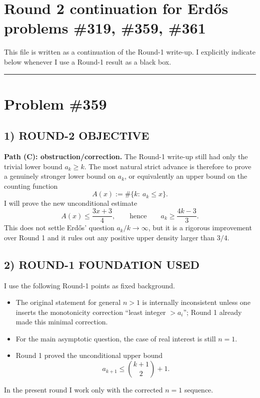 
\section*{Round 2 continuation for Erd\H{o}s problems \#319, \#359, \#361}

This file is written as a continuation of the Round-1 write-up.  I explicitly indicate below whenever I use a Round-1 result as a black box.

\bigskip
\hrule
\bigskip

\section*{Problem \#359}

\subsection*{1) ROUND-2 OBJECTIVE}
\textbf{Path (C): obstruction/correction.}  The Round-1 write-up still had only the trivial lower bound $a_k\ge k$.  The most natural strict advance is therefore to prove a genuinely stronger lower bound on $a_k$, or equivalently an upper bound on the counting function
\[
A(x):=\#\{k:\ a_k\le x\}.
\]
I will prove the new unconditional estimate
\[
A(x)\le \frac{3x+3}{4},
\qquad\text{hence}\qquad
a_k\ge \frac{4k-3}{3}.
\]
This does not settle Erd\H{o}s' question $a_k/k\to\infty$, but it is a rigorous improvement over Round 1 and it rules out any positive upper density larger than $3/4$.

\subsection*{2) ROUND-1 FOUNDATION USED}
I use the following Round-1 points as fixed background.

\begin{itemize}
\item The original statement for general $n>1$ is internally inconsistent unless one inserts the monotonicity correction ``least integer $>a_i$''; Round 1 already made this minimal correction.
\item For the main asymptotic question, the case of real interest is still $n=1$.
\item Round 1 proved the unconditional upper bound
\[
a_{k+1}\le \binom{k+1}{2}+1.
\]
\end{itemize}

In the present round I work only with the corrected $n=1$ sequence.

